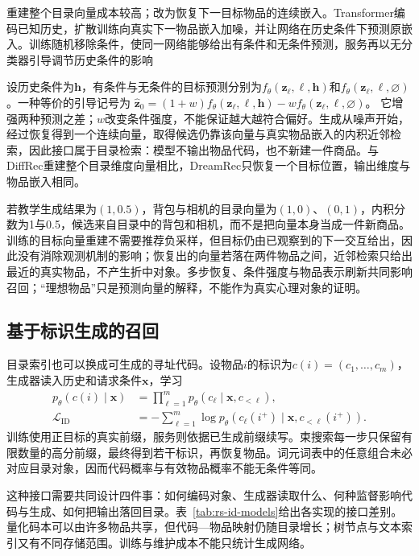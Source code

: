 重建整个目录向量成本较高；改为恢复下一目标物品的连续嵌入。Transformer编码已知历史，扩散训练向真实下一物品嵌入加噪，并让网络在历史条件下预测原嵌入。训练随机移除条件，使同一网络能够给出有条件和无条件预测，服务再以无分类器引导调节历史条件的影响

设历史条件为$\bm h$，有条件与无条件的目标预测分别为$f_\theta(\bm z_\ell,\ell,\bm h)$和$f_\theta(\bm z_\ell,\ell,\varnothing)$。一种等价的引导记号为
$\widehat{\bm z}_0=(1+w)f_\theta(\bm z_\ell,\ell,\bm h)-w f_\theta(\bm z_\ell,\ell,\varnothing)$。
它增强两种预测之差；$w$改变条件强度，不能保证越大越符合偏好。生成从噪声开始，经过恢复得到一个连续向量，取得候选仍靠该向量与真实物品嵌入的内积近邻检索，因此接口属于目录检索：模型不输出物品代码，也不新建一件商品。与DiffRec重建整个目录维度向量相比，DreamRec只恢复一个目标位置，输出维度与物品嵌入相同。

若教学生成结果为$(1,0.5)$，背包与相机的目录向量为$(1,0)$、$(0,1)$，内积分数为1与0.5，候选来自目录中的背包和相机，而不是把向量本身当成一件新商品。训练的目标向量重建不需要推荐负采样，但目标仍由已观察到的下一交互给出，因此没有消除观测机制的影响；恢复出的向量若落在两件物品之间，近邻检索只给出最近的真实物品，不产生折中对象。多步恢复、条件强度与物品表示刷新共同影响召回；“理想物品”只是预测向量的解释，不能作为真实心理对象的证明。

\subsection{基于标识生成的召回}
\label{sec:rs-identifier-retrieval}

目录索引也可以换成可生成的寻址代码。设物品$i$的标识为$c(i)=(c_1,\ldots,c_m)$，生成器读入历史和请求条件$\bm x$，学习
\begin{equation}
 \begin{aligned}
 p_\theta(c(i)\mid\bm x)
 &=\prod_{\ell=1}^m p_\theta(c_\ell\mid\bm x,c_{<\ell}),\\
 \mathcal L_{\mathrm{ID}}
 &=-\sum_{\ell=1}^m\log p_\theta(c_\ell(i^+)\mid\bm x,c_{<\ell}(i^+)).
 \end{aligned}
 \label{eq:rs-id-generation}
\end{equation}
训练使用正目标的真实前缀，服务则依据已生成前缀续写。束搜索每一步只保留有限数量的高分前缀，最终得到若干标识，再恢复物品。词元词表中的任意组合未必对应目录对象，因而代码概率与有效物品概率不能无条件等同。

这种接口需要共同设计四件事：如何编码对象、生成器读取什么、何种监督影响代码与生成、如何把输出落回目录。表~\ref{tab:rs-id-models}给出各实现的接口差别。量化码本可以由许多物品共享，但代码—物品映射仍随目录增长；树节点与文本索引又有不同存储范围。训练与维护成本不能只统计生成网络。

